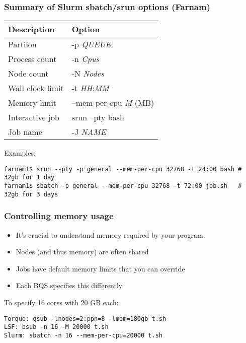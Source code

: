 \documentclass[10pt]{beamer}
\newcommand\smallfont{\fontsize{8pt}{7.2}\selectfont}
\begin{document}
\begin{frame}[fragile]
\frametitle{Summary of Slurm sbatch/srun options (Farnam)}
\begin{tabular}{|l|l|}
\hline
\textbf{Description} & \textbf{Option} \\
\hline
Partiion & -p \textit{QUEUE} \\
\hline
Process count & -n \textit{Cpus} \\
\hline
Node count & -N \textit{Nodes} \\
\hline
Wall clock limit & -t \textit{HH}:\textit{MM} \\
\hline
Memory limit & --mem-per-cpu \textit{M} (MB)\\
\hline
Interactive job & srun --pty bash \\
\hline
Job name & -J \textit{NAME} \\
\hline
\end{tabular}

\vskip10pt
Examples:
\smallfont
\begin{verbatim}
farnam1$ srun --pty -p general --mem-per-cpu 32768 -t 24:00 bash # 32gb for 1 day
farnam1$ sbatch -p general --mem-per-cpu 32768 -t 72:00 job.sh   # 32gb for 3 days
\end{verbatim}
\end{frame}

\begin{frame}[fragile]
\frametitle{Controlling memory usage}
\begin{itemize}
\item It's crucial to understand memory required by your program.
\item Nodes (and thus memory) are often shared
\item Jobs have default memory limits that you can override
\item Each BQS specifies this differently
\end{itemize}

To specify 16 cores with 20 GB each:  
\begin{verbatim}
Torque: qsub -lnodes=2:ppn=8 -lmem=180gb t.sh
LSF: bsub -n 16 -M 20000 t.sh
Slurm: sbatch -n 16 --mem-per-cpu=20000 t.sh

\end{verbatim}
\end{frame}
\end{document}
